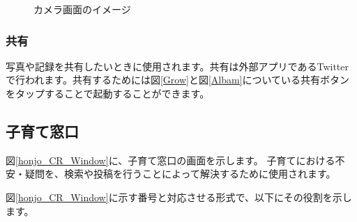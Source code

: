 \documentclass[a4j]{jarticle}
\begin{document}
\begin{figure}[H]
    \begin{center}
    \caption {カメラ画面のイメージ}
    \label{Camera}
    \end{center}
\end{figure}


\subsubsection{共有}
写真や記録を共有したいときに使用されます。共有は外部アプリであるTwitterで行われます。共有するためには図\ref{Grow}と図\ref{Albam}についている共有ボタンをタップすることで起動することができます。

\subsection{子育て窓口}
図\ref{honjo_CR_Window}に、子育て窓口の画面を示します。
子育てにおける不安・疑問を、検索や投稿を行うことによって解決するために使用されます。

図\ref{honjo_CR_Window}に示す番号と対応させる形式で、以下にその役割を示します。
\end{document}
